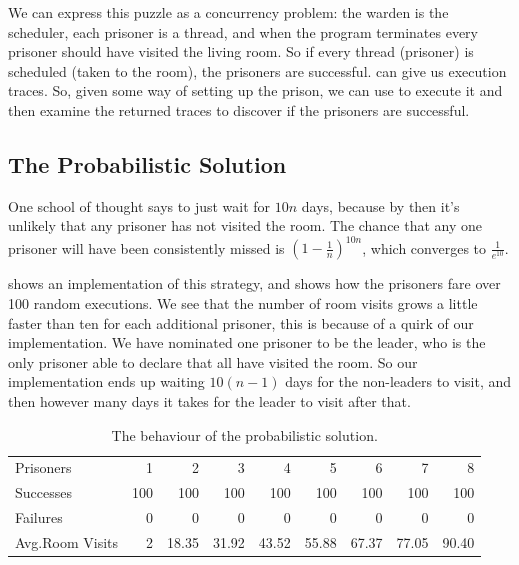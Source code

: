 We can express this puzzle as a concurrency problem: the warden is the
scheduler, each prisoner is a thread, and when the program terminates
every prisoner should have visited the living room.  So if every
thread (prisoner) is scheduled (taken to the room), the prisoners are
successful.  \dejafu{} can give us execution traces.  So, given some
way of setting up the prison, we can use \dejafu{} to execute it and
then examine the returned traces to discover if the prisoners are
successful.

\subsection{The Probabilistic Solution}

One school of thought says to just wait for $10 n$ days, because by
then it's unlikely that any prisoner has not visited the room.  The
chance that any one prisoner will have been consistently missed is
$\left(1 - \frac{1}{n}\right)^{10n}$, which converges to
$\frac{1}{e^{10}}$.

 shows an implementation of this strategy, and
 shows how the prisoners fare over 100 random
executions.  We see that the number of room visits grows a little
faster than ten for each additional prisoner, this is because of a
quirk of our implementation.  We have nominated one prisoner to be the
leader, who is the only prisoner able to declare that all have visited
the room.  So our implementation ends up waiting $10 (n - 1)$ days for
the non-leaders to visit, and then however many days it takes for the
leader to visit after that.

\begin{table}
  \centering
  \begin{tabular}{lrrrrrrrr} \toprule
    Prisoners          &   1 &   2    &   3    &   4    &   5    &   6    &   7    &   8 \\
    Successes          & 100 & 100    & 100    & 100    & 100    & 100    & 100    & 100 \\
    Failures           &   0 &   0    &   0    &   0    &   0    &   0    &   0    &   0 \\
    Avg.\@ Room Visits &   2 &  18.35 &  31.92 &  43.52 &  55.88 &  67.37 &  77.05 &  90.40 \\ \bottomrule
  \end{tabular}
  \caption{The behaviour of the probabilistic solution.}\label{tbl:100rand}
\end{table}

